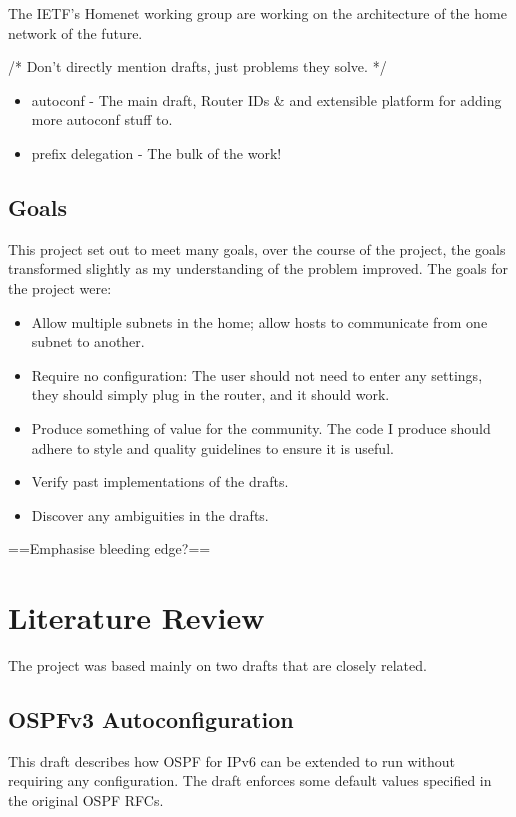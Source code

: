 \documentclass[12pt]{report}
\begin{document}
The IETF's Homenet working group are working on the architecture of the home
network of the future. 


/* Don't directly mention drafts, just problems they solve. */
\begin{itemize}
\item autoconf - The main draft, Router IDs \& and extensible platform for
  adding more autoconf stuff to.
\item prefix delegation - The bulk of the work!
\end{itemize}

\section{Goals}
This project set out to meet many goals, over the course of the project, the
goals transformed slightly as my understanding of the problem improved. The
goals for the project were:


\begin{itemize}
\item Allow multiple subnets in the home; allow hosts to communicate from one
  subnet to another.
\item Require no configuration: The user should not need to enter any settings,
  they should simply plug in the router, and it should work.
\item Produce something of value for the community. The code I produce should
  adhere to style and quality guidelines to ensure it is useful.
\item Verify past implementations of the drafts.
\item Discover any ambiguities in the drafts.
\end{itemize}

==Emphasise bleeding edge?==

\chapter{Literature Review} 

The project was based mainly on two drafts that are closely related.

\section{OSPFv3 Autoconfiguration}
This draft describes how OSPF for IPv6 can be extended to run without requiring
any configuration. The draft enforces some default values specified in the
original OSPF RFCs.
\end{document}
